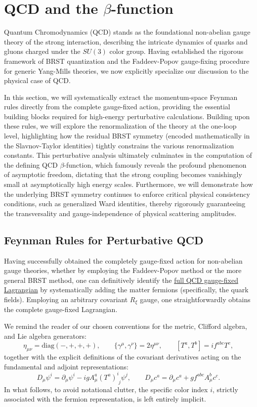 \section{QCD and the $\beta$-function}

Quantum Chromodynamics (QCD) stands as the foundational non-abelian gauge theory of the strong interaction, describing the intricate dynamics of quarks and gluons charged under the \(SU(3)\) color group. Having established the rigorous framework of BRST quantization and the Faddeev-Popov gauge-fixing procedure for generic Yang-Mills theories, we now explicitly specialize our discussion to the physical case of QCD.

In this section, we will systematically extract the momentum-space Feynman rules directly from the complete gauge-fixed action, providing the essential building blocks required for high-energy perturbative calculations. Building upon these rules, we will explore the renormalization of the theory at the one-loop level, highlighting how the residual BRST symmetry (encoded mathematically in the Slavnov-Taylor identities) tightly constrains the various renormalization constants. This perturbative analysis ultimately culminates in the computation of the defining QCD \(\beta\)-function, which famously reveals the profound phenomenon of asymptotic freedom, dictating that the strong coupling becomes vanishingly small at asymptotically high energy scales. Furthermore, we will demonstrate how the underlying BRST symmetry continues to enforce critical physical consistency conditions, such as generalized Ward identities, thereby rigorously guaranteeing the transversality and gauge-independence of physical scattering amplitudes.

\subsection{Feynman Rules for Perturbative QCD}

Having successfully obtained the completely gauge-fixed action for non-abelian gauge theories, whether by employing the Faddeev-Popov method or the more general BRST method, one can definitively identify the \uline{full QCD gauge-fixed Lagrangian} by systematically adding the matter fermions (specifically, the quark fields). Employing an arbitrary covariant $R_\xi$ gauge, one straightforwardly obtains the complete gauge-fixed Lagrangian.

We remind the reader of our chosen conventions for the metric, Clifford algebra, and Lie algebra generators:
\[\eta_{\mu\nu} = \text{diag}(-, +, +, +), \qquad \{\gamma^\mu, \gamma^\nu\} = 2\eta^{\mu\nu}, \qquad [T^a, T^b] = i f^{abc} T^c,\]
together with the explicit definitions of the covariant derivatives acting on the fundamental and adjoint representations:
\[D_\mu\psi^i = \partial_\mu\psi^i - i g A_\mu^a (T^a)^i_{\phantom{i}j} \psi^j, \qquad D_\mu c^a = \partial_\mu c^a + g f^{abc} A_\mu^b c^c.\]
In what follows, to avoid notational clutter, the specific color index $i$, strictly associated with the fermion representation, is left entirely implicit.

